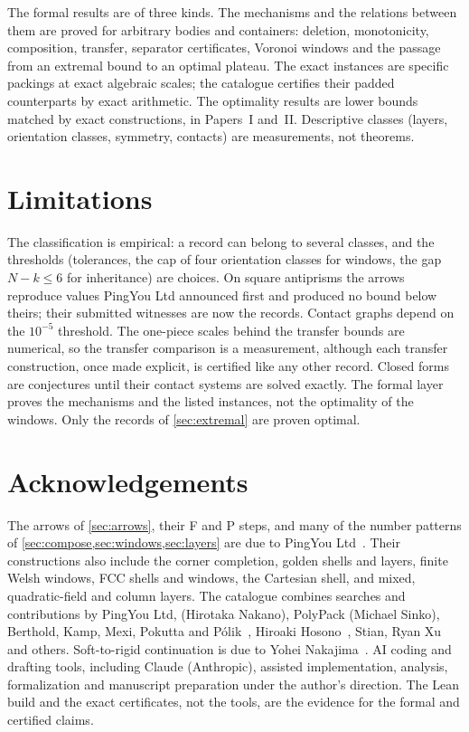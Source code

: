 \documentclass[11pt,a4paper]{article}
\begin{document}
The formal results are of three kinds. The mechanisms and the relations between them are proved for arbitrary bodies and containers: deletion, monotonicity, composition, transfer, separator certificates, Voronoi windows and the passage from an extremal bound to an optimal plateau. The exact instances are specific packings at exact algebraic scales; the catalogue certifies their padded counterparts by exact arithmetic. The optimality results are lower bounds matched by exact constructions, in Papers~I and~II. Descriptive classes (layers, orientation classes, symmetry, contacts) are measurements, not theorems.

\section{Limitations}\label{sec:limits}

The classification is empirical: a record can belong to several classes, and the thresholds (tolerances, the cap of four orientation classes for windows, the gap $N-k\le6$ for inheritance) are choices. On square antiprisms the arrows reproduce values PingYou Ltd announced first and produced no bound below theirs; their submitted witnesses are now the records. Contact graphs depend on the $10^{-5}$ threshold. The one-piece scales behind the transfer bounds are numerical, so the transfer comparison is a measurement, although each transfer construction, once made explicit, is certified like any other record. Closed forms are conjectures until their contact systems are solved exactly. The formal layer proves the mechanisms and the listed instances, not the optimality of the windows. Only the \nProven{} records of \cref{sec:extremal} are proven optimal.

\section*{Acknowledgements}
The arrows of \cref{sec:arrows}, their F and P steps, and many of the number patterns of \cref{sec:compose,sec:windows,sec:layers} are due to PingYou Ltd~\cite{pingSixteen,pingArrows}. Their constructions also include the corner completion, golden shells and layers, finite Welsh windows, FCC shells and windows, the Cartesian shell, and mixed, quadratic-field and column layers. The catalogue combines searches and contributions by PingYou Ltd,  (Hirotaka Nakano), PolyPack (Michael Sinko), Berthold, Kamp, Mexi, Pokutta and P\'olik~\cite{berthold2026}, Hiroaki Hosono~\cite{hosono}, Stian, Ryan Xu and others. Soft-to-rigid continuation is due to Yohei Nakajima~\cite{nakajima2026}. AI coding and drafting tools, including Claude (Anthropic), assisted implementation, analysis, formalization and manuscript preparation under the author's direction. The Lean build and the exact certificates, not the tools, are the evidence for the formal and certified claims.
\end{document}
